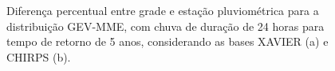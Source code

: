 \documentclass[
]{agujournal2019}
\begin{document}
\begin{figure}

\begin{minipage}{\linewidth}



\end{minipage}%
\newline
\begin{minipage}{\linewidth}



\end{minipage}%

\caption{\label{fig-Figura22}Diferença percentual entre grade e estação
pluviométrica para a distribuição GEV-MME, com chuva de duração de 24
horas para tempo de retorno de 5 anos, considerando as bases XAVIER (a)
e CHIRPS (b).}

\end{figure}%
\end{document}
